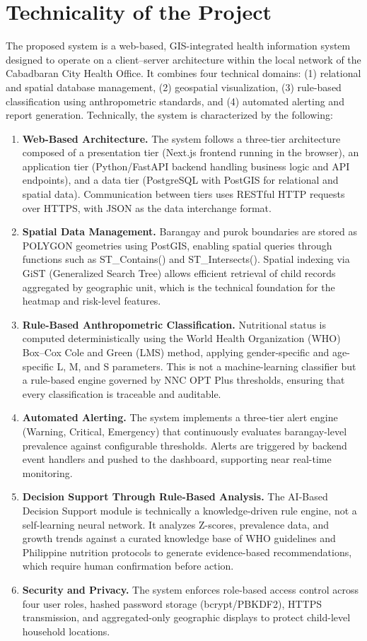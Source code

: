 \documentclass[12pt, a4paper]{report}
\begin{document}
\section{Technicality of the Project}
\label{sec:technicality}
The proposed system is a web-based, GIS-integrated health information system designed to operate on a client--server architecture within the local network of the Cabadbaran City Health Office. It combines four technical domains: (1) relational and spatial database management, (2) geospatial visualization, (3) rule-based classification using anthropometric standards, and (4) automated alerting and report generation.
Technically, the system is characterized by the following:
\begin{enumerate}
    \item \textbf{Web-Based Architecture.} The system follows a three-tier architecture composed of a presentation tier (Next.js frontend running in the browser), an application tier (Python/FastAPI backend handling business logic and API endpoints), and a data tier (PostgreSQL with PostGIS for relational and spatial data). Communication between tiers uses RESTful HTTP requests over HTTPS, with JSON as the data interchange format.
    \item \textbf{Spatial Data Management.} Barangay and purok boundaries are stored as POLYGON geometries using PostGIS, enabling spatial queries through functions such as ST\_Contains() and ST\_Intersects(). Spatial indexing via GiST (Generalized Search Tree) allows efficient retrieval of child records aggregated by geographic unit, which is the technical foundation for the heatmap and risk-level features.
    \item \textbf{Rule-Based Anthropometric Classification.} Nutritional status is computed deterministically using the World Health Organization (WHO) Box--Cox Cole and Green (LMS) method, applying gender-specific and age-specific L, M, and S parameters. This is not a machine-learning classifier but a rule-based engine governed by NNC OPT Plus thresholds, ensuring that every classification is traceable and auditable.
    \item \textbf{Automated Alerting.} The system implements a three-tier alert engine (Warning, Critical, Emergency) that continuously evaluates barangay-level prevalence against configurable thresholds. Alerts are triggered by backend event handlers and pushed to the dashboard, supporting near real-time monitoring.
    \item \textbf{Decision Support Through Rule-Based Analysis.} The AI-Based Decision Support module is technically a knowledge-driven rule engine, not a self-learning neural network. It analyzes Z-scores, prevalence data, and growth trends against a curated knowledge base of WHO guidelines and Philippine nutrition protocols to generate evidence-based recommendations, which require human confirmation before action.
    \item \textbf{Security and Privacy.} The system enforces role-based access control across four user roles, hashed password storage (bcrypt/PBKDF2), HTTPS transmission, and aggregated-only geographic displays to protect child-level household locations.
\end{enumerate}
\end{document}
